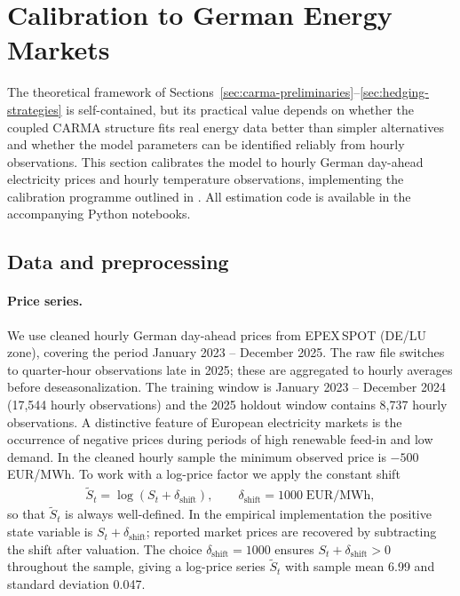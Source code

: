 
\section{Calibration to German Energy Markets}\label{sec:calibration}

The theoretical framework of Sections~\ref{sec:carma-preliminaries}--\ref{sec:hedging-strategies}
is self-contained, but its practical value depends on whether the coupled CARMA
structure fits real energy data better than simpler alternatives and whether the
model parameters can be identified reliably from hourly observations.
This section calibrates the model to hourly German day-ahead electricity prices
and hourly temperature observations, implementing the calibration programme
outlined in .
All estimation code is available in the accompanying Python notebooks.

\subsection{Data and preprocessing}\label{ssec:data}

\paragraph{Price series.}
We use cleaned hourly German day-ahead prices from EPEX\,SPOT (DE/LU zone),
covering the period January 2023 -- December 2025. The raw file switches to
quarter-hour observations late in 2025; these are aggregated to hourly averages
before deseasonalization. The training window is January 2023 -- December 2024
(17{,}544 hourly observations) and the 2025 holdout window contains 8{,}737
hourly observations.
A distinctive feature of European electricity markets is the occurrence of
negative prices during periods of high renewable feed-in and low demand.
In the cleaned hourly sample the minimum observed price is $-500$\,EUR/MWh.
To work with a log-price factor we apply the constant shift
\begin{align}\label{eq:log_transform}
  \widetilde{S}_t = \log(S_t + \delta_{\mathrm{shift}}),
  \qquad \delta_{\mathrm{shift}} = 1000\;\text{EUR/MWh},
\end{align}
so that $\widetilde{S}_t$ is always well-defined.
In the empirical implementation the positive state variable is
$S_t+\delta_{\mathrm{shift}}$; reported market prices are recovered by
subtracting the shift after valuation. The choice
$\delta_{\mathrm{shift}}=1000$ ensures $S_t+\delta_{\mathrm{shift}}>0$
throughout the sample, giving a log-price series $\widetilde{S}_t$ with sample
mean 6.99 and standard deviation 0.047.

